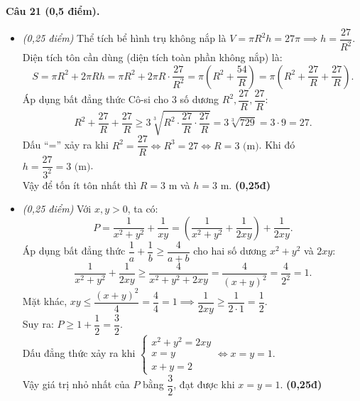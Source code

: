 \documentclass[11pt,a4paper]{article}
\begin{document}
\vspace{2mm}
\noindent
\textbf{Câu 21 (0,5 điểm).}
\begin{itemize}
  \item[a)] \textit{(0,25 điểm)}
  Thể tích bể hình trụ không nắp là $V = \pi R^2 h = 27\pi \implies h = \dfrac{27}{R^2}$.\\
  Diện tích tôn cần dùng (diện tích toàn phần không nắp) là:
  \[
  S = \pi R^2 + 2\pi R h = \pi R^2 + 2\pi R \cdot \dfrac{27}{R^2} = \pi \left( R^2 + \dfrac{54}{R} \right) = \pi \left( R^2 + \dfrac{27}{R} + \dfrac{27}{R} \right).
  \]
  Áp dụng bất đẳng thức Cô-si cho 3 số dương $R^2, \dfrac{27}{R}, \dfrac{27}{R}$:
  \[
  R^2 + \dfrac{27}{R} + \dfrac{27}{R} \ge 3\sqrt[3]{R^2 \cdot \dfrac{27}{R} \cdot \dfrac{27}{R}} = 3\sqrt[3]{729} = 3 \cdot 9 = 27.
  \]
  Dấu ``='' xảy ra khi $R^2 = \dfrac{27}{R} \iff R^3 = 27 \iff R = 3\text{ (m)}$. Khi đó $h = \dfrac{27}{3^2} = 3\text{ (m)}$.\\
  Vậy để tốn ít tôn nhất thì $R = 3\text{ m}$ và $h = 3\text{ m}$. \dotfill \textbf{(0,25đ)}

  \item[b)] \textit{(0,25 điểm)}
  Với $x, y > 0$, ta có:
  \[
  P = \dfrac{1}{x^2 + y^2} + \dfrac{1}{xy} = \left( \dfrac{1}{x^2 + y^2} + \dfrac{1}{2xy} \right) + \dfrac{1}{2xy}.
  \]
  Áp dụng bất đẳng thức $\dfrac{1}{a} + \dfrac{1}{b} \ge \dfrac{4}{a+b}$ cho hai số dương $x^2+y^2$ và $2xy$:
  \[
  \dfrac{1}{x^2 + y^2} + \dfrac{1}{2xy} \ge \dfrac{4}{x^2 + y^2 + 2xy} = \dfrac{4}{(x+y)^2} = \dfrac{4}{2^2} = 1.
  \]
  Mặt khác, $xy \le \dfrac{(x+y)^2}{4} = \dfrac{4}{4} = 1 \implies \dfrac{1}{2xy} \ge \dfrac{1}{2 \cdot 1} = \dfrac{1}{2}$.\\
  Suy ra: $P \ge 1 + \dfrac{1}{2} = \dfrac{3}{2}$.\\
  Dấu đẳng thức xảy ra khi $\begin{cases} x^2 + y^2 = 2xy \\ x = y \\ x + y = 2 \end{cases} \iff x = y = 1$.\\
  Vậy giá trị nhỏ nhất của $P$ bằng $\dfrac{3}{2}$, đạt được khi $x = y = 1$. \dotfill \textbf{(0,25đ)}
\end{itemize}
\end{document}
